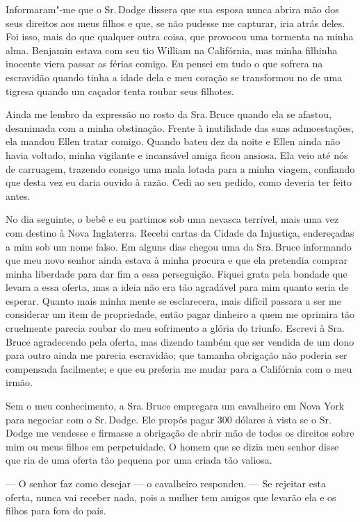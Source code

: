 Informaram"-me que o Sr.\,Dodge dissera que sua esposa nunca abrira mão
dos seus direitos aos meus filhos e que, se não pudesse me capturar,
iria atrás deles. Foi isso, mais do que qualquer outra coisa, que
provocou uma tormenta na minha alma. Benjamin estava com seu tio William
na Califórnia, mas minha filhinha inocente viera passar as férias
comigo. Eu pensei em tudo o que sofrera na escravidão quando tinha a
idade dela e meu coração se transformou no de uma tigresa quando um
caçador tenta roubar seus filhotes.

Ainda me lembro da expressão no rosto
da Sra.\,Bruce quando ela se afastou, desanimada com a minha obstinação.
Frente à inutilidade das suas admoestações, ela mandou Ellen tratar
comigo. Quando bateu dez da noite e Ellen ainda não havia voltado, minha
vigilante e incansável amiga ficou ansiosa. Ela veio até nós de
carruagem, trazendo consigo uma mala lotada para a minha viagem,
confiando que desta vez eu daria ouvido à razão. Cedi ao seu pedido,
como deveria ter feito antes.

No dia seguinte, o bebê e eu partimos
sob uma nevasca terrível, mais uma vez com destino à Nova Inglaterra.
Recebi cartas da Cidade da Injustiça, endereçadas a mim sob um nome
falso. Em alguns dias chegou uma da Sra.\,Bruce informando que meu novo
senhor ainda estava à minha procura e que ela pretendia comprar minha
liberdade para dar fim a essa perseguição. Fiquei grata pela bondade que
levara a essa oferta, mas a ideia não era tão agradável para mim quanto
seria de esperar. Quanto mais minha mente se esclarecera, mais difícil
passara a ser me considerar um item de propriedade, então pagar dinheiro
a quem me oprimira tão cruelmente parecia roubar do meu sofrimento a
glória do triunfo. Escrevi à Sra.\,Bruce agradecendo pela oferta, mas
dizendo também que ser vendida de um dono para outro ainda me parecia
escravidão; que tamanha obrigação não poderia ser compensada facilmente;
e que eu preferia me mudar para a Califórnia com o meu irmão.

Sem o meu conhecimento, a Sra.\,Bruce
empregara um cavalheiro em Nova York para negociar com o Sr.\,Dodge. Ele
propôs pagar 300 dólares à vista se o Sr.\,Dodge me vendesse e firmasse a
obrigação de abrir mão de todos os direitos sobre mim ou meus filhos em
perpetuidade. O homem que se dizia meu senhor disse que ria de uma
oferta tão pequena por uma criada tão valiosa.

--- O senhor faz como desejar --- o cavalheiro respondeu. --- Se
rejeitar esta oferta, nunca vai receber nada, pois a mulher tem amigos
que levarão ela e os filhos para fora do país.

